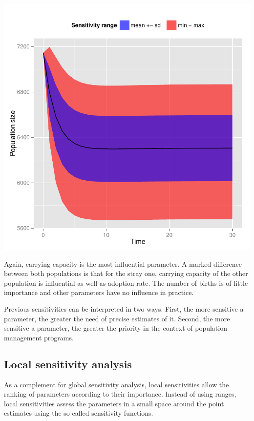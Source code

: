 \documentclass[a4paper]{article}
\begin{document}
\begin{center}
\includegraphics{capm_example-039}
\end{center}
Again, carrying capacity is the most influential parameter. A marked difference between both populations is that for the stray one, carrying capacity of the other population is influential as well as adoption rate. The number of births is of little importance and other parameters have no influence in practice.

Previous sensitivities can be interpreted in two ways. First, the more sensitive a parameter, the greater the need of precise estimates of it. Second, the more sensitive a parameter, the greater the priority in the context of population management programs.

\subsection{Local sensitivity analysis}
As a complement for global sensitivity analysis, local sensitivities allow the ranking of parameters according to their importance. Instead of using ranges, local sensitivities assess the parameters in a small space around the point estimates using the so-called sensitivity functions.
\end{document}
